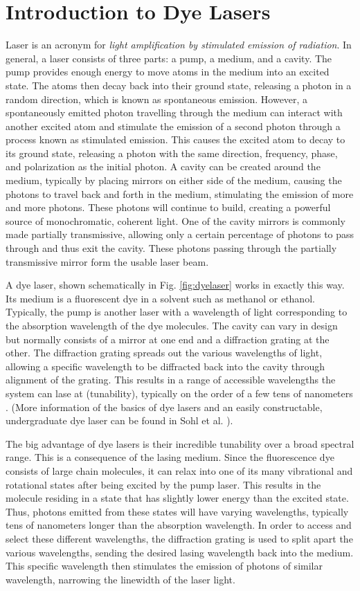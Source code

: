 \section{Introduction to Dye Lasers}
Laser is an acronym for \textit{light amplification by stimulated emission of radiation}. In general, a laser consists of three parts: a pump, a medium, and a cavity. The pump provides enough energy to move atoms in the medium into an excited state. The atoms then decay back into their ground state, releasing a photon in a random direction, which is known as spontaneous emission. However, a spontaneously emitted photon travelling through the medium can interact with another excited atom and stimulate the emission of a second photon through a process known as stimulated emission. This causes the excited atom to decay to its ground state, releasing a photon with the same direction, frequency, phase, and polarization as the initial photon. A cavity can be created around the medium, typically by placing mirrors on either side of the medium, causing the photons to travel back and forth in the medium, stimulating the emission of more and more photons. These photons will continue to build, creating a powerful source of monochromatic, coherent light. One of the cavity mirrors is commonly made partially transmissive, allowing only a certain percentage of photons to pass through and thus exit the cavity. These photons passing through the partially transmissive mirror form the usable laser beam. 

A dye laser, shown schematically in Fig. \ref{fig:dyelaser} works in exactly this way. Its medium is a fluorescent dye in a solvent such as methanol or ethanol. Typically, the pump is another laser with a wavelength of light corresponding to the absorption wavelength of the dye molecules. The cavity can vary in design but normally consists of a mirror at one end and a diffraction grating at the other. The diffraction grating spreads out the various wavelengths of light, allowing a specific wavelength to be diffracted back into the cavity through alignment of the grating. This results in a range of accessible wavelengths the system can lase at (tunability), typically on the order of a few tens of nanometers \cite{Sohl1997}. (More information of the basics of dye lasers and an easily constructable, undergraduate dye laser can be found in Sohl et al. \cite{Sohl1997}).

The big advantage of dye lasers is their incredible tunability over a broad spectral range. This is a consequence of the lasing medium. Since the fluorescence dye consists of large chain molecules, it can relax into one of its many vibrational and rotational states after being excited by the pump laser. This results in the molecule residing in a state that has slightly lower energy than the excited state. Thus, photons emitted from these states will have varying wavelengths, typically tens of nanometers longer than the absorption wavelength. In order to access and select these different wavelengths, the diffraction grating is used to split apart the various wavelengths, sending the desired lasing wavelength back into the medium. This specific wavelength then stimulates the emission of photons of similar wavelength, narrowing the linewidth of the laser light.

